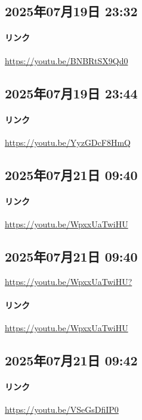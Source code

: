 \subsection*{2025年07月19日 23:32}

\paragraph{リンク}
\url{https://youtu.be/BNBRtSX9Qd0}

\subsection*{2025年07月19日 23:44}

\paragraph{リンク}
\url{https://youtu.be/YyzGDcF8HmQ}

\subsection*{2025年07月21日 09:40}

\paragraph{リンク}
\url{https://youtu.be/WpxxUaTwiHU}

\subsection*{2025年07月21日 09:40}

\url{https://youtu.be/WpxxUaTwiHU?}

\paragraph{リンク}
\url{https://youtu.be/WpxxUaTwiHU}

\subsection*{2025年07月21日 09:42}

\paragraph{リンク}
\url{https://youtu.be/VSeGsDfiIP0}

